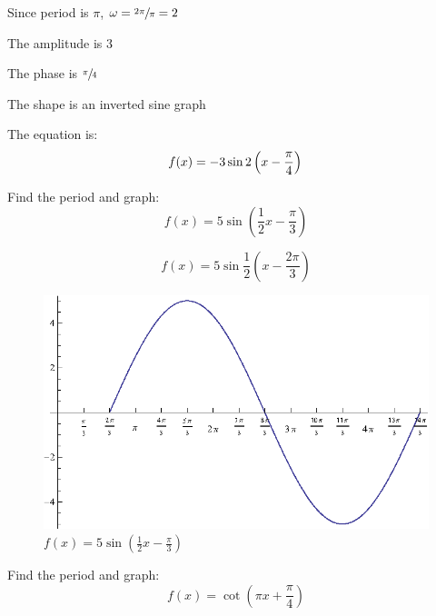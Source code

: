 \documentclass[fleqn,addpoints]{exam}
\begin{document}
\begin{questions}
      \begin{solution}
        \begin{itemize*}
          \item Since period is $\pi$, $\omega = \sfrac{2 \pi}{\pi} = 2$
          \item The amplitude is 3
          \item The phase is $\sfrac{\pi}{4}$
          \item The shape is an inverted sine graph
        \end{itemize*}

        The equation is:
        \[
          f(x) = - 3 \sin 2 \left( x - \frac{\pi}{4} \right) \\
        \]

      \end{solution}

    \question[10]
      Find the period and graph:
      \[
        f(x) = 5 \sin \left( \frac{1}{2} x - \frac{\pi}{3} \right)
      \]

      \begin{solution}
        \[
          f(x) = 5 \sin \frac{1}{2} \left( x - \frac{2 \pi}{3} \right) 
        \]

        \begin{figure}[H]
          \centering
          \includegraphics{graph1.eps}
          \caption{$f(x) = 5 \sin \left( \frac{1}{2} x - \frac{\pi}{3} \right)$}
        \end{figure}

      \end{solution}

    \ifprintanswers
      \pagebreak
    \fi

    \question[10]
      Find the period and graph:
      \[
        f(x) = \cot \left( \pi x + \frac{\pi}{4} \right)
      \]


\end{questions}
\end{document}
